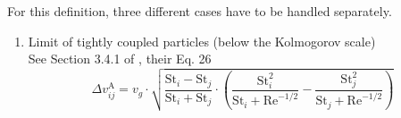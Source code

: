         For this definition, three different cases have to be handled separately.
        \begin{enumerate}
            \item Limit of tightly coupled particles (below the Kolmogorov scale) \\
                See Section 3.4.1 of \cite{ormel_cuzzi_2007}, their Eq. 26
                \begin{equation}
                    \Delta v_{ij}^\text{A}
                    = v_g \cdot \sqrt{
                        \frac{\text{St}_i - \text{St}_j}{\text{St}_i + \text{St}_j} \cdot 
                        \left(
                            \frac{\text{St}_i^2}{\text{St}_i + \text{Re}^{-1/2}} -
                            \frac{\text{St}_j^2}{\text{St}_j + \text{Re}^{-1/2}}
                        \right)
                    }
                \end{equation} 


\end{enumerate}
